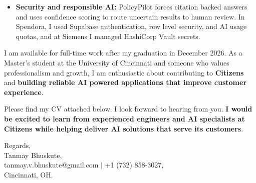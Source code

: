 \documentclass[11pt]{letter}
\begin{document}
\begin{letter}{}
\begin{itemize}[leftmargin=*, itemsep=0.45em]
    \item \textbf{Security and responsible AI:} PolicyPilot forces citation backed answers and uses confidence scoring to route uncertain results to human review. In Spendora, I used Supabase authentication, row level security, and AI usage quotas, and at Siemens I managed HashiCorp Vault secrets.
\end{itemize}

I am available for full-time work after my graduation in December 2026. As a Master's student at the University of Cincinnati and someone who values professionalism and growth, I am enthusiastic about contributing to \textbf{Citizens} and \textbf{building reliable AI powered applications that improve customer experience}.

Please find my CV attached below. I look forward to hearing from you. \textbf{I would be excited to learn from experienced engineers and AI specialists at Citizens while helping deliver AI solutions that serve its customers}.

{\setlength{\parskip}{0pt}
Regards,\\
Tanmay Bhuskute,\\
tanmay.v.bhuskute@gmail.com $\mid$ +1 (732) 858-3027,\\
Cincinnati, OH.
}

\end{letter}
\end{document}
